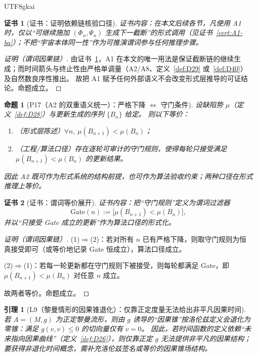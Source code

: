 \documentclass[12pt]{article}
\newtheorem{proposition}{命题}[section]
\newtheorem{lemma}{引理}[section]
\newtheorem{Certificate}{证书}[section]
\begin{document}
\begin{CJK*}{UTF8}{gkai}
\begin{Certificate}[证书：证明依赖链核验口径]
\label{cert:P16}
证书内容：在本文后续各节，凡使用 A1 时，仅以“可继续施加 $(\Phi_n,\Psi_n)$ 生成下一截断”的形式调用（见证书~\ref{cert:A1-ba}）；不把“宇宙本体同一性”作为可推演谓词参与任何推理步骤。
\end{Certificate}

\begin{proof}[证明（谓词因果链）]
由证书~\ref{cert:P16}，A1 在本文的唯一用法是保证截断链的继续生成；而时间箭头与终止性由严格单调量（A2/A8、定义~\ref{def:D29} 或~\ref{def:D40}）及自然数良序性推出。
故把 A1 赋予任何外部语义不会改变形式层推导的可证结论。命题成立。
\end{proof}

\begin{proposition}[P17（A2 的双重语义统一）：严格下降 $\Leftrightarrow$ 守门条件]
\label{prop:P17}
设缺陷势 $\mu$（定义~\ref{def:D28}）与更新生成的序列 $\{B_n\}$ 给定。
则以下等价：
\begin{enumerate}
\item （形式层陈述）$\forall n,\ \mu(B_{n+1})<\mu(B_n)$；
\item （工程/算法口径）存在逐轮可审计的守门规则，使得每轮只接受满足 $\mu(B_{n+1})<\mu(B_n)$ 的更新结果。
\end{enumerate}
因此 A2 既可作为形式系统的结构前提，也可作为算法验收约束；两种口径在形式推理上等价。
\end{proposition}

\begin{Certificate}[证书：谓词等价展开]
\label{cert:P17}
证书内容：把“守门规则”定义为谓词过滤器
\[
\mathrm{Gate}(n):=\bigl[\mu(B_{n+1})<\mu(B_n)\bigr],
\]
并以“只接受 Gate 成立的更新”作为算法口径的形式化。
\end{Certificate}

\begin{proof}[证明（谓词因果链）]
(1)$\Rightarrow$(2)：若对所有 $n$ 已有严格下降，则取守门规则为恒真接受即可（或等价地记录 Gate 恒成立），算法口径成立。

(2)$\Rightarrow$(1)：若每一轮更新都在守门规则下被接受，则每轮都满足 Gate，即 $\mu(B_{n+1})<\mu(B_n)$ 对任意 $n$ 成立。

故两者等价。命题成立。
\end{proof}

\begin{lemma}[L9（黎曼情形的因果锥退化）：仅靠正定度量无法给出非平凡因果时间]
\label{lem:L9}
若 $A=(M,g)$ 为正定黎曼流形，则由 $g$ 诱导的“因果锥”按洛伦兹定义会退化为零锥：满足 $g(v,v)\le 0$ 的切向量仅有 $v=0$。
因此，若时间函数的定义依赖“未来指向因果曲线”（定义~\ref{def:D26}），则仅靠正定 $g$ 无法提供非平凡的因果结构；要获得非退化时间概念，需补充洛伦兹签名或等价的因果锥场结构。
\end{lemma}


\end{CJK*}
\end{document}
